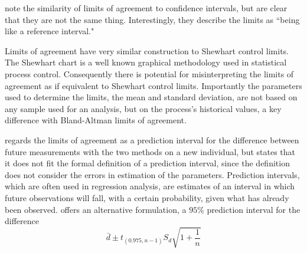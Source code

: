 \documentclass[12pt, a4paper]{report}
\theoremstyle{plain}
\theoremstyle{definition}
\theoremstyle{remark}
\begin{document}
	\citet{BA99} note the similarity of limits of agreement to
	confidence intervals, but are clear that they are not the same
	thing. Interestingly, they describe the limits as ``being like a
	reference interval."
	
	Limits of agreement have very similar construction to Shewhart
	control limits. The Shewhart chart is a well known graphical
	methodology used in statistical process control. Consequently
	there is potential for misinterpreting the limits of agreement as
	if equivalent to Shewhart control limits. Importantly the
	parameters used to determine the limits, the mean and standard
	deviation, are not based on any sample used for an analysis, but
	on the process's historical values, a key difference with
	Bland-Altman limits of agreement.
	
	\citet{BXC2008} regards the limits of agreement as a prediction
	interval for the difference between future measurements with the
	two methods on a new individual, but states that it does not fit
	the formal definition of a prediction interval, since the
	definition does not consider the errors in estimation of the
	parameters. Prediction intervals, which are often used in
	regression analysis, are estimates of an interval in which future
	observations will fall, with a certain probability, given what has
	already been observed. \citet{BXC2008} offers an alternative
	formulation, a $95\%$ prediction interval for the difference
	\begin{equation}
	\bar{d} \pm t_{(0.975, n-1)}S_{d} \sqrt{1+\frac{1}{n}}
	\end{equation}
	
\end{document}
